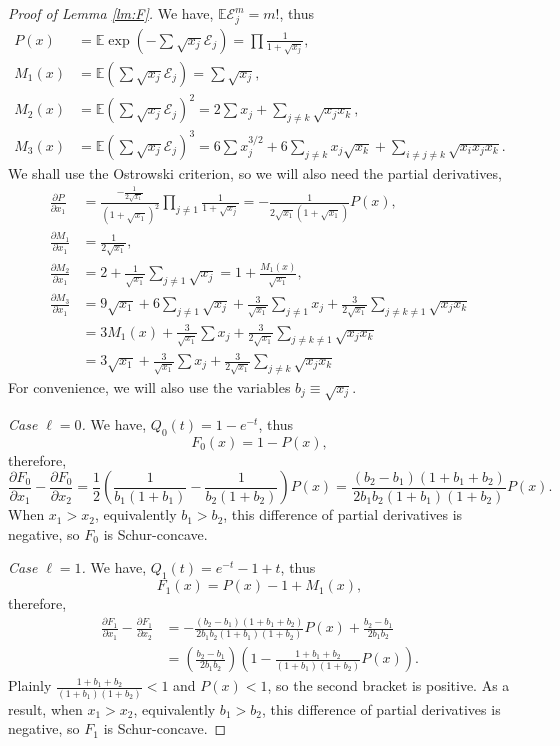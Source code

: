 \documentclass[10pt]{article}
\newcommand{\E}{\mathbb{E}}
\newcommand{\1}{\textbf{1}}
\newcommand{\cE}{\mathscr{E}}
\theoremstyle{remark}
\theoremstyle{definition}
\begin{document}
\begin{proof}[Proof of Lemma \ref{lm:F}]
We have, $\E \cE_j^m = m!$, thus
\begin{align*}
P(x) &= \E \exp\left(-\sum \sqrt{x_j}\cE_j\right) = \prod \frac{1}{1+\sqrt{x_j}}, \\
M_1(x) &= \E \left(\sum \sqrt{x_j}\cE_j\right) = \sum \sqrt{x_j}, \\
M_2(x) &= \E \left(\sum \sqrt{x_j}\cE_j\right)^2 = 2\sum x_j + \sum_{j \neq k} \sqrt{x_jx_k}, \\
M_3(x) &= \E \left(\sum \sqrt{x_j}\cE_j\right)^3 = 6\sum x_j^{3/2} + 6\sum_{j \neq k} x_j\sqrt{x_k} + \sum_{i \neq j \neq k} \sqrt{x_ix_jx_k}.
\end{align*}
We shall use the Ostrowski criterion, so we will also need the partial derivatives,
\begin{align*}
\frac{\partial P}{\partial x_1} &= \frac{-\frac{1}{2\sqrt{x_1}}}{(1+\sqrt{x_1})^2}\prod_{j\neq 1} \frac{1}{1+\sqrt{x_j}} = -\frac{1}{2\sqrt{x_1}(1+\sqrt{x_1})}P(x),\\
\frac{\partial M_1}{\partial x_1} &= \frac{1}{2\sqrt{x_1}},\\
\frac{\partial M_2}{\partial x_1} &= 2 + \frac{1}{\sqrt{x_1}}\sum_{j\neq 1}\sqrt{x_j} = 1+\frac{M_1(x)}{\sqrt{x_1}},\\
\frac{\partial M_3}{\partial x_1} &= 9\sqrt{x_1} + 6\sum_{j\neq 1}\sqrt{x_j} + \frac{3}{\sqrt{x_1}}\sum_{j\neq 1}x_j + \frac{3}{2\sqrt{x_1}}\sum_{j\neq k \neq 1} \sqrt{x_jx_k} \\
&= 3M_1(x) + \frac{3}{\sqrt{x_1}}\sum x_j + \frac{3}{2\sqrt{x_1}}\sum_{j\neq k \neq 1} \sqrt{x_jx_k}\\
&=3\sqrt{x_1}+\frac{3}{\sqrt{x_1}}\sum x_j + \frac{3}{2\sqrt{x_1}}\sum_{j\neq k} \sqrt{x_jx_k}
\end{align*}
For convenience, we will also use the variables $b_j \equiv \sqrt{x_j}$.

\emph{Case $\ell = 0$.} We have, $Q_0(t) = 1 - e^{-t}$, thus
\[
F_0(x) = 1 - P(x),
\]
therefore,
\[
\frac{\partial F_0}{\partial x_1} - \frac{\partial F_0}{\partial x_2} = \frac12\left(\frac{1}{b_1(1+b_1)} - \frac{1}{b_2(1+b_2)}\right)P(x) = \frac{(b_2-b_1)(1+b_1+b_2)}{2b_1b_2(1+b_1)(1+b_2)}P(x).
\]
When $x_1 > x_2$, equivalently $b_1 > b_2$, this difference of partial derivatives is negative, so $F_0$ is Schur-concave.

\emph{Case $\ell = 1$.}
We have, $Q_1(t) = e^{-t} -1 + t$, thus
\[
F_1(x) = P(x)-1 + M_1(x),
\]
therefore,
\begin{align*}
\frac{\partial F_1}{\partial x_1} - \frac{\partial F_1}{\partial x_2} &= -\frac{(b_2-b_1)(1+b_1+b_2)}{2b_1b_2(1+b_1)(1+b_2)}P(x) + \frac{b_2-b_1}{2b_1b_2} \\
&=\left(\frac{b_2-b_1}{2b_1b_2}\right)\left(1 - \frac{1+b_1+b_2}{(1+b_1)(1+b_2)}P(x)\right).
\end{align*}
Plainly $\frac{1+b_1+b_2}{(1+b_1)(1+b_2)} < 1$ and $P(x) < 1$, so the second bracket is positive.
As a result, when $x_1 > x_2$, equivalently $b_1 > b_2$, this difference of partial derivatives is negative, so $F_1$ is Schur-concave.



\end{proof}
\end{document}
